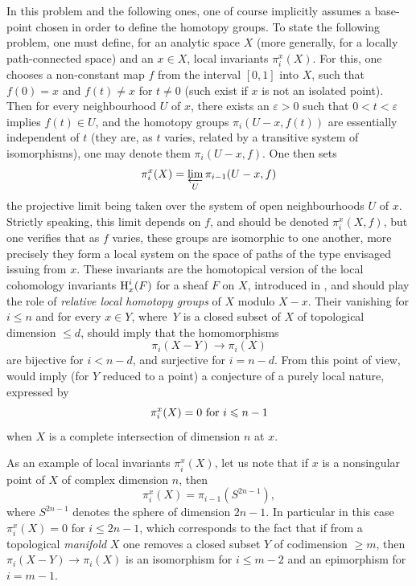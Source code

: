 %
In this problem and the following ones, one of course implicitly assumes a base-point chosen in order to define the homotopy groups. To state the following problem, one must define, for an analytic space $X$ (more generally, for a locally path-connected space) and an $x\in X$, local invariants $\pi_i^x(X)$.\label{pagexpo} For this, one chooses a non-constant map $f$ from the interval $[0, 1]$ into $X$, such that $f(0)=x$ and $f(t)\neq x$ for $t\neq 0$ (such exist if $x$ is not an isolated point). Then for every neighbourhood $U$ of $x$, there exists an $\varepsilon>0$ such that $0<t<\varepsilon$ implies $f(t)\in U$, and the homotopy groups $\pi_i(U-x, f(t))$ are essentially independent of $t$ (they are, as $t$ varies, related by a transitive system of isomorphisms), one may denote them $\pi_i(U-x, f)$. One then sets\label{pip15}\label{pXIII.15}
$$
\pi_i^x(X)= \varprojlim_{U}\pi_{i-1}(U-x, f)
$$
the projective limit being taken over the system of open neighbourhoods $U$ of $x$. Strictly speaking, this limit depends on $f$, and should be denoted $\pi_i^x(X, f)$, but one verifies that as $f$ varies, these groups are isomorphic to one another, more precisely they form a local system on the space of paths of the type envisaged issuing from $x$. These invariants are the homotopical version of the local cohomology invariants $\H^i_x(F)$ for a sheaf $F$ on $X$, introduced in , and should play the role of \emph{relative local homotopy groups} of $X$ modulo $X-x$. Their vanishing for $i\le n$ and for every $x\in Y$, where~$Y$ is a closed subset of $X$ of topological dimension $\le d$, should imply that the homomorphisms
$$
\pi_i(X-Y) \to \pi_i(X)
$$
are bijective for $i<n-d$, and surjective for $i=n-d$. From this point of view,  would imply (for $Y$ reduced to a point) a conjecture of a purely local nature, expressed by 
$$
\pi_i^x(X)=0 \rm{\ for\ } i\le n-1\label{p15l}
$$
when $X$ is a complete intersection of dimension $n$ at $x$.

As an example of local invariants $\pi_i^x(X)$, let us note that if $x$ is a nonsingular point of $X$ of complex dimension $n$, then
$$
\pi_i^x(X)=\pi_{i-1}(S^{2n-1}),
$$
where $S^{2n-1}$ denotes the sphere of dimension $2n-1$. In particular in this case $\pi_{i}^x(X)=0$ for $i\le 2n-1$, which corresponds to the fact that if from a topological \emph{manifold} $X$ one removes a closed subset $Y$ of codimension $\ge m$, then $\pi_i(X-Y)\to \pi_i(X)$ is an isomorphism for $i\le m-2$ and an epimorphism for $i=m-1$.

